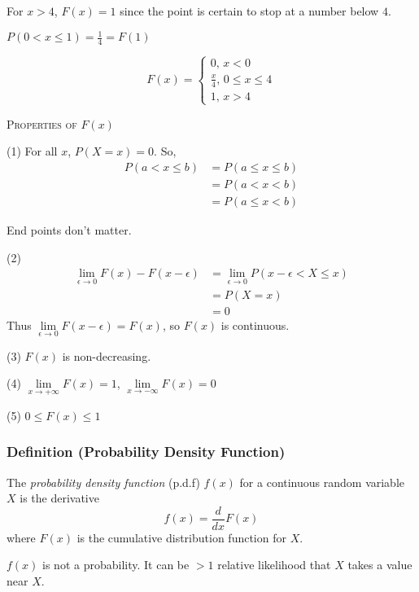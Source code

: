 For $ x>4 $, $ F(x)=1 $ since the point is certain to stop at a number
below $ 4 $.

$ P(0<x\le 1)=\frac{1}{4}=F(1) $

\[ F(x)=\begin{cases}
    0,\, x<0\\
    \frac{x}{4},\,0\le x\le 4 \\
    1,\,x>4
\end{cases} \]

\textsc{Properties of $ F(x) $}

(1) For all $ x $, $ P(X=x)=0 $. So,
\begin{align*}
    P(a<x\le b)&=P(a\le x\le b)\\
    &=P(a<x<b)\\
    &=P(a\le x<b)
\end{align*}
\begin{remark}
    End points don't matter.
\end{remark}

(2) \begin{align*}
    \lim\limits_{{\epsilon} \to {0}} F(x)-F(x-\epsilon)&=
    \lim\limits_{{\epsilon} \to {0}} P(x-\epsilon<X\le x)\\
    &=P(X=x)\\
    &=0
\end{align*}
Thus $ \lim\limits_{{\epsilon} \to {0}} F(x-\epsilon)=F(x) $, so
$ F(x) $ is continuous.

(3) $ F(x) $ is non-decreasing.

(4) $ \lim\limits_{{x} \to {+\infty}} F(x)=1 $,
$ \lim\limits_{{x} \to {-\infty}} F(x)=0 $

(5) $ 0\le F(x)\le 1 $

\begin{defbox}
    \subsubsection{Definition (Probability Density Function)}
    The \emph{probability density function} (p.d.f) $ f(x) $ for a continuous
    random variable $ X $ is the derivative
    \[ f(x)=\frac{d}{dx}F(x) \]
    where $ F(x) $ is the cumulative distribution function for $ X $.
\end{defbox}

\begin{remark}
    $ f(x) $ is not a probability. It can be $ >1 $ relative
    likelihood that $ X $ takes a value near $ X $.
\end{remark}

